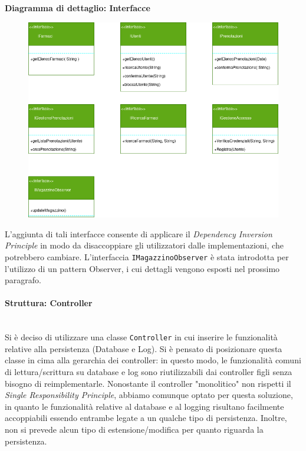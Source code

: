 \textbf{Diagramma di dettaglio: Interfacce}
\begin{figure}[h!]
    \begin{center}
        \includegraphics[width=\textwidth]{immagini/Interfacce-progettazione.png}
    \end{center}
\end{figure}

L'aggiunta di tali interfacce consente di applicare il \textit{Dependency Inversion Principle}
in modo da disaccoppiare gli utilizzatori dalle implementazioni, che potrebbero cambiare.
L'interfaccia \texttt{IMagazzinoObserver} è stata introdotta per l'utilizzo di un pattern Observer,
i cui dettagli vengono esposti nel prossimo paragrafo.

\newpage

\paragraph{Struttura: Controller}\mbox{}\\

Si è deciso di utilizzare una classe \texttt{Controller} in cui inserire le funzionalità relative alla persistenza (Database e Log).
Si è pensato di posizionare questa classe in cima alla gerarchia dei controller:
in questo modo, le funzionalità comuni di lettura/scrittura su database e log sono riutilizzabili dai controller figli senza bisogno di reimplementarle.
Nonostante il controller "monolitico" non rispetti il \textit{Single Responsibility Principle},
abbiamo comunque optato per questa soluzione, in quanto le funzionalità relative al database e al logging risultano facilmente accoppiabili essendo entrambe legate a un qualche tipo di persistenza.
Inoltre, non si prevede alcun tipo di estensione/modifica per quanto riguarda la persistenza.
\vspace{2em}


